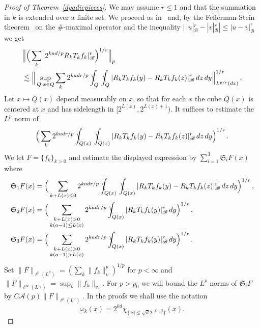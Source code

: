 \documentclass[11pt]{amsart}
\theoremstyle{definition}
\numberwithin{theorem}{section}
\numberwithin{definition}{section}
\renewcommand{\wp}{\upsilon}
\def\intslash{\rlap{\kern  .32em $\mspace {.5mu}\backslash$ }\int}
\newcommand{\note}[1]{\footnote{\texttt{\Small #1}}}
\def\intslash{\rlap{\kern  .32em $\mspace {.5mu}\backslash$ }\int}
\def\sB{{\mathscr{B}}}
\def\lc{\lesssim}
\def\om{\omega}              \def\Om{\Omega}
\def\fS{{\mathfrak {S}}}
\def\cA{{\mathcal {A}}}
\def\cB{{\mathcal {B}}}
\begin{document}
\begin{proof}[Proof of Theorem~\ref{dyadicpieces}]
We may assume $r\le 1$ and that the summation in  $k$ is extended over a finite set. We proceed as in~\cite{prrose} and,
by the Fefferman-Stein theorem~\cite{fest}  on the $\#$-maximal operator and the inequality $|\,|u|_{\sB}^r-|v|_{\cB}^r|\le |u-v|_{\cB}^r$
we get
\begin{align*}
&\Big\|\Big(\sum_k |2^{kad/p} R_kT_kf_k|^r_{\sB} \Big)^{1/r}\Big\|_{p}
\\&\lc\Big\|\sup_{Q:x\in Q} \sum_k 2^{kad r/p}
\intslash_Q \intslash_Q
| R_kT_kf_k(y)-R_kT_kf_k(z)|_\sB^r \, dz \,dy
\Big\|_{L^{p/r}(dx)}^{1/r}\,.
\end{align*}
Let $x\mapsto Q(x)$ depend measurably on $x$, so that for each $x$
the cube $Q(x)$ is centered at $x$ and has sidelength   in
$[2^{L(x)}, 2^{L(x)+1})$.
It suffices to estimate the $L^p$ norm of
$$\Big( \sum_k 2^{kad r/p}
\intslash_{Q(x)} \intslash_{Q(x)}
| R_kT_kf_k(y)-R_kT_kf_k(z)|_\sB^r \, dz \,dy\Big)^{1/r}\,.$$
We let  $F=\{f_k\}_{k>0}$
and estimate the displayed expression by
$\sum_{i=1}^3\fS_i F(x)$
 where
\begin{align*}
\fS_1F(x)&=\Big(\sum_{k+L(x)\le 0} 2^{kad r/p}
\intslash_{Q(x)} \intslash_{Q(x)}
| R_kT_kf_k(y)-R_kT_kf_k(z)|_\sB^r \, dz \,dy
\Big)^{1/r}\,,
\\
\fS_2F(x)&=\Big(\sum_{\substack{ k+L(x)> 0\\ k(a-1)\le L(x)}}
 2^{kad r/p}
\intslash_{Q(x)}
| R_kT_kf_k(y)|_\sB^r \,dy
\Big)^{1/r}\,,
\\
\fS_3F(x)&=\Big(\sum_{\substack{ k+L(x)> 0\\ k(a-1)> L(x)}}
 2^{kad r/p}
\intslash_{Q(x)}
| R_kT_kf_k(y)|_\sB^r \,dy
\Big)^{1/r}\,.
\end{align*}
Set $\|F\|_{\ell^p(L^\wp)}=
(\sum_k\|f_k\|_\wp^p)^{1/p}$  for $p<\infty$
and
$\|F\|_{\ell^\infty(L^{\wp_1})}= \sup_k \|f_k\|_{\wp_1}$.
For $p>p_0$  we will
bound  the $L^p$ norms of
$\fS_i F$ by $C\cA(p)\|F\|_{\ell^p(L^\wp)}$.
In the proofs we shall use the notation
$$\om_k(x)= 2^{kd} \chi_{\{|x|\le \sqrt d 2^{-k+3}\}}(x).$$





\end{proof}
\end{document}

